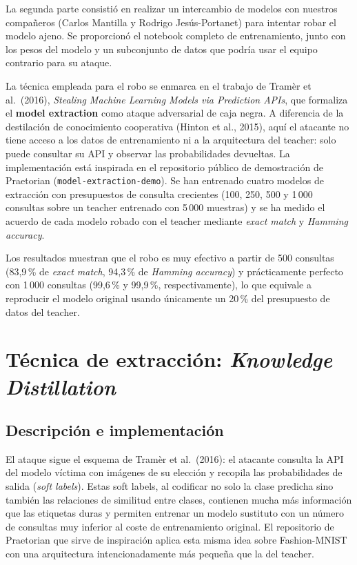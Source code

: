 \documentclass[11pt,a4paper]{article}
\begin{document}
La segunda parte consistió en realizar un intercambio de modelos con nuestros compañeros (Carlos Mantilla y Rodrigo Jesús-Portanet) para intentar robar el modelo ajeno. Se proporcionó el notebook completo de entrenamiento, junto con los pesos del modelo y un subconjunto de datos que podría usar el equipo contrario para su ataque.

La técnica empleada para el robo se enmarca en el trabajo de Tramèr et al.\ (2016), \textit{Stealing Machine Learning Models via Prediction APIs}, que formaliza el \textbf{model extraction} como ataque adversarial de caja negra. A diferencia de la destilación de conocimiento cooperativa (Hinton et al., 2015), aquí el atacante no tiene acceso a los datos de entrenamiento ni a la arquitectura del teacher: solo puede consultar su API y observar las probabilidades devueltas. La implementación está inspirada en el repositorio público de demostración de Praetorian (\texttt{model-extraction-demo}). Se han entrenado cuatro modelos de extracción con presupuestos de consulta crecientes (100, 250, 500 y 1\,000 consultas sobre un teacher entrenado con 5\,000 muestras) y se ha medido el acuerdo de cada modelo robado con el teacher mediante \textit{exact match} y \textit{Hamming accuracy}.

Los resultados muestran que el robo es muy efectivo a partir de 500 consultas (83,9\,\% de \textit{exact match}, 94,3\,\% de \textit{Hamming accuracy}) y prácticamente perfecto con 1\,000 consultas (99,6\,\% y 99,9\,\%, respectivamente), lo que equivale a reproducir el modelo original usando únicamente un 20\,\% del presupuesto de datos del teacher.

\section{Técnica de extracción: \textit{Knowledge Distillation}}

\subsection{Descripción e implementación}

El ataque sigue el esquema de Tramèr et al.\ (2016): el atacante consulta la API del modelo víctima con imágenes de su elección y recopila las probabilidades de salida (\textit{soft labels}). Estas soft labels, al codificar no solo la clase predicha sino también las relaciones de similitud entre clases, contienen mucha más información que las etiquetas duras y permiten entrenar un modelo sustituto con un número de consultas muy inferior al coste de entrenamiento original. El repositorio de Praetorian que sirve de inspiración aplica esta misma idea sobre Fashion-MNIST con una arquitectura intencionadamente más pequeña que la del teacher.
\end{document}
